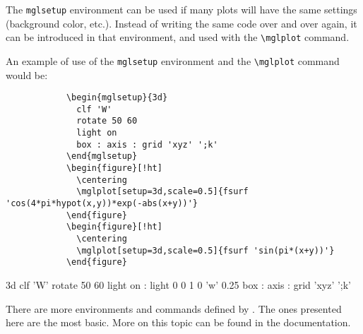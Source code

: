 \documentclass{article}
\begin{document}
\begin{description}
		The \verb|mglsetup| environment can be used if many plots will have the same settings (background color, etc.). Instead of writing the same code over and over again, it can be introduced in that environment, and used with the \verb|\mglplot| command.
		
		An example of use of the \verb|mglsetup| environment and the \verb|\mglplot| command would be:
		\begin{verbatim}
			\begin{mglsetup}{3d}
			  clf 'W'
			  rotate 50 60
			  light on
			  box : axis : grid 'xyz' ';k'
			\end{mglsetup}
			\begin{figure}[!ht]
			  \centering
			  \mglplot[setup=3d,scale=0.5]{fsurf 'cos(4*pi*hypot(x,y))*exp(-abs(x+y))'}
			\end{figure}
			\begin{figure}[!ht]
			  \centering
			  \mglplot[setup=3d,scale=0.5]{fsurf 'sin(pi*(x+y))'}
			\end{figure}
		\end{verbatim}
		\begin{mglsetup}{3d}
			clf 'W'
			rotate 50 60
			light on : light 0 0 1 0 'w' 0.25
			box : axis : grid 'xyz' ';k'
		\end{mglsetup}
		\begin{figure}[!ht]
			\centering
		\end{figure}
		\begin{figure}[!ht]
			\centering
		\end{figure}
	\end{description}
	
	There are more environments and commands defined by \mglTeX{}. The ones presented here are the most basic. More on this topic can be found in the documentation.
\end{document}
